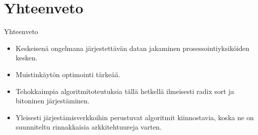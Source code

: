\documentclass{beamer}
\begin{document}
\section{Yhteenveto}

\begin{frame}{Yhteenveto}{}
    \begin{itemize}
        \item Keskeisenä ongelmana järjestettävän datan jakaminen prosessointiyksiköiden kesken.
        \item Muistinkäytön optimointi tärkeää.
        \item Tehokkaimpia algoritmitoteutuksia tällä hetkellä ilmeisesti radix sort ja bitoninen järjestäminen.
        \item Yleisesti järjestämisverkkoihin perustuvat algoritmit kiinnostavia, koska ne on suunniteltu rinnakkaisia arkkitehtuureja varten.
    \end{itemize}
\end{frame}
\end{document}
